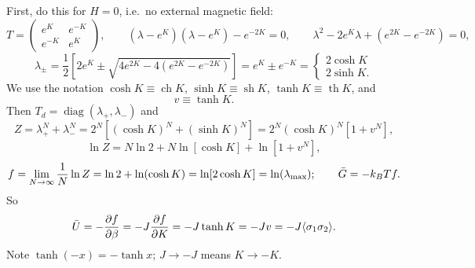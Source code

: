 First, do this for $H = 0$, i.e.\ no external magnetic field:
\begin{equation}
  T = \begin{pmatrix} e^{K} & e^{-K}\\ e^{-K} & e^{K}\end{pmatrix},\qquad
  (\lambda - e^K)(\lambda - e^K) - e^{-2K} = 0,\qquad
  \lambda^2 - 2e^K\lambda + (e^{2K}-e^{-2K}) = 0,
\end{equation}
\begin{equation}
  \lambda_\pm = \frac{1}{2}\left[2e^K\pm\sqrt{4e^{2K}-4(e^{2K}-e^{-2K})}\right]
  = e^K\pm e^{-K} = \begin{cases} 2\cosh K\\ 2\sinh K.\end{cases}
\end{equation}
We use the notation $\cosh K\equiv\operatorname{ch}K$, $\sinh K\equiv\operatorname{sh}K$,
$\tanh K\equiv\operatorname{th}K$, and
\begin{equation}
  v\equiv\tanh K .
\end{equation}
Then $T_d = \operatorname{diag}(\lambda_+,\lambda_-)$ and
\begin{equation}
  Z = \lambda_+^N + \lambda_-^N = 2^N\left[(\cosh K)^N + (\sinh K)^N\right]
    = 2^N(\cosh K)^N\left[1 + v^N\right],
\end{equation}
\begin{equation}
  \ln Z = N\ln 2 + N\ln[\cosh K] + \ln[1+v^N],
\end{equation}
\begin{equation}
  f = \lim_{N\to\infty}\frac{1}{N}\ln Z = \ln 2 + \ln(\cosh K) = \ln[2\cosh K] = \ln(\lambda_{\max});
  \qquad \bar G = -k_{B} Tf .
\end{equation}
So
\begin{equation}
  \bar U = -\frac{\partial f}{\partial \beta} = -J\frac{\partial f}{\partial K} = -J\tanh K = -Jv = -J\langle \sigma_1\sigma_2\rangle.
\end{equation}
Note $\tanh(-x) = -\tanh x$; $J\to -J$ means $K\to -K$.

\begin{diagram}
\end{diagram}
